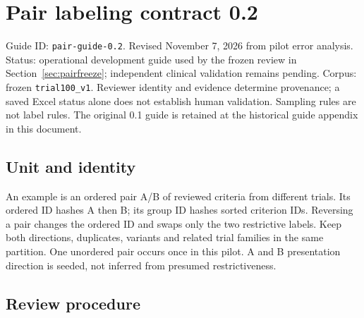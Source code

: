 \documentclass[10pt,letterpaper]{article}
\newcommand{\pathcode}[1]{\nolinkurl{#1}}
\begin{document}
\clearpage
\section{Pair labeling contract 0.2}\label{contract02-pair-labeling-contract-02}\label{sec:labelingcontract}

Guide ID: \pathcode{pair-guide-0.2}. Revised November 7, 2026 from pilot error analysis. Status: operational development guide used by the frozen review in Section~\ref{sec:pairfreeze}; independent clinical validation remains pending. Corpus: frozen \pathcode{trial100_v1}. Reviewer identity and evidence determine provenance; a saved Excel status alone does not establish human validation. Sampling rules are not label rules. The original 0.1 guide is retained at the historical guide appendix in this document.

\subsection{Unit and identity}\label{contract02-unit-and-identity}

An example is an ordered pair A/B of reviewed criteria from different trials. Its ordered ID hashes A then B; its group ID hashes sorted criterion IDs. Reversing a pair changes the ordered ID and swaps only the two restrictive labels. Keep both directions, duplicates, variants and related trial families in the same partition. One unordered pair occurs once in this pilot. A and B presentation direction is seeded, not inferred from presumed restrictiveness.

\subsection{Review procedure}\label{contract02-review-procedure}
\end{document}

